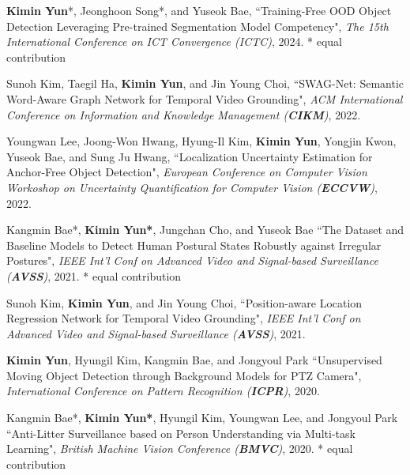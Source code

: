 \documentclass[10pt]{article}
\makeatletter
\newlength{\bibhang}
\newlength{\bibsep}
 {\@listi \global\bibsep\itemsep \global\advance\bibsep by\parsep}
\newenvironment{bibsection}%
        {\vspace{-\baselineskip}\begin{list}{}{%
       \setlength{\leftmargin}{\bibhang}%
       \setlength{\itemindent}{-\leftmargin}%
       \setlength{\itemsep}{\bibsep}%
       \setlength{\parsep}{\z@}%
        \setlength{\partopsep}{0pt}%
        \setlength{\topsep}{0pt}}}
        {\end{list}\vspace{-.6\baselineskip}}
\makeatother
\begin{document}
\begin{bibsection}
        \item \textbf{Kimin Yun}*, Jeonghoon Song*, and Yuseok Bae, 
        ``Training-Free OOD Object Detection Leveraging Pre-trained Segmentation Model Competency", 
        \emph{ The 15th International Conference on ICT Convergence (ICTC)}, 2024.
        * equal contribution

        \item Sunoh Kim, Taegil Ha, \textbf{Kimin Yun}, and Jin Young Choi, 
				``SWAG-Net: Semantic Word-Aware Graph Network for Temporal Video Grounding",
				 \emph{ACM International Conference on Information and Knowledge Management (\textbf{CIKM})}, 2022.

     	\item Youngwan Lee, Joong-Won Hwang, Hyung-Il Kim, \textbf{Kimin Yun}, Yongjin Kwon, Yuseok Bae, and Sung Ju Hwang, 
				``Localization Uncertainty Estimation for Anchor-Free Object Detection",
				 \emph{European Conference on Computer Vision Workoshop on Uncertainty Quantification for Computer Vision (\textbf{ECCVW})}, 2022.


	\item Kangmin Bae*, \textbf{Kimin Yun*}, Jungchan Cho, and Yuseok Bae
				``The Dataset and Baseline Models to Detect Human Postural States Robustly against Irregular Postures",
				 \emph{IEEE Int'l Conf on Advanced Video and Signal-based Surveillance (\textbf{AVSS})}, 2021.
				 * equal contribution
				 
	\item Sunoh Kim, \textbf{Kimin Yun}, and Jin Young Choi, 
				``Position-aware Location Regression Network for Temporal Video Grounding",
				 \emph{IEEE Int'l Conf on Advanced Video and Signal-based Surveillance (\textbf{AVSS})}, 2021.

	\item \textbf{Kimin Yun}, Hyungil Kim, Kangmin Bae, and Jongyoul Park
				``Unsupervised Moving Object Detection through Background Models for PTZ Camera",
				 \emph{International Conference on Pattern Recognition (\textbf{ICPR})}, 2020.
				 
	 \item Kangmin Bae*, \textbf{Kimin Yun*}, Hyungil Kim, Youngwan Lee, and Jongyoul Park
				``Anti-Litter Surveillance based on Person Understanding via Multi-task Learning",
				 \emph{British Machine Vision Conference (\textbf{BMVC})}, 2020. 
				 * equal contribution
				 

\end{bibsection}
\end{document}
